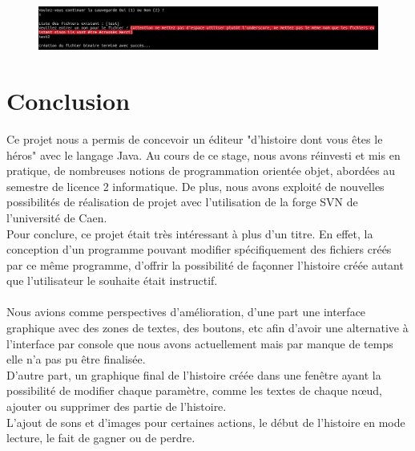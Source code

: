 \documentclass[12pt]{article}
\begin{document}
\begin{figure}[h]
  \centering
    \includegraphics[width=1\textwidth]{Save}
\end{figure}

\clearpage
\section{Conclusion}
Ce projet nous a permis de concevoir un éditeur "d'histoire dont vous êtes le héros" avec le langage Java.
Au cours de ce stage, nous avons réinvesti et mis en pratique, de nombreuses notions de programmation orientée objet, abordées au
semestre de licence 2 informatique. De plus, nous avons exploité de nouvelles possibilités de réalisation de projet avec l'utilisation de la forge SVN de l'université de Caen.\\
Pour conclure, ce projet était très intéressant à plus d’un titre. En effet, la conception d'un programme pouvant modifier spécifiquement des fichiers créés par ce même programme, d'offrir la possibilité de façonner l'histoire créée autant que l'utilisateur le souhaite était instructif.\bigskip
\\
\\
Nous avions comme perspectives d'amélioration, d'une part une interface graphique avec des zones de textes, des boutons, etc afin d'avoir une alternative à l'interface par console que nous avons actuellement mais par manque de temps elle n'a pas pu être finalisée.\\
D'autre part, un graphique final de l'histoire créée dans une fenêtre ayant la possibilité de modifier chaque paramètre, comme les textes de chaque nœud, ajouter ou supprimer des partie de l'histoire.\\
L'ajout de sons et d'images pour certaines actions, le début de l'histoire en mode lecture, le fait de gagner ou de perdre.
\end{document}

